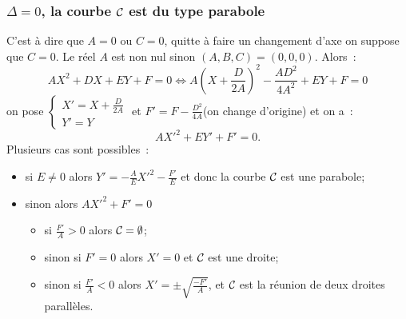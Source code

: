 \subsubsection{\(\Delta=0\), la courbe \(\mathcal{C}_{{}}\) est du type parabole}
C'est à dire que \(A=0\) ou \(C=0\), quitte à faire un changement d'axe on suppose que \(C=0\). Le réel \(A\) est non nul sinon \((A,B,C)=(0,0,0)\). Alors~:
\begin{equation}
  AX^2+DX+EY+F=0 \iff A\left(X+\frac{D}{2A}\right)^2-\frac{AD^2}{4A^2}+EY+F=0
\end{equation}
on pose \(\begin{cases}X'=X+\frac{D}{2A} \\ Y'=Y\end{cases}\) et \(F'=F-\frac{D^2}{4A}\)(on change d'origine) et on a~:
\begin{equation}
  AX'^2+EY'+F'=0.
\end{equation}
Plusieurs cas sont possibles~:
\begin{itemize}
\item si \(E \neq 0\) alors \(Y'=-\frac{A}{E}X'^2-\frac{F'}{E}\) et donc la courbe \(\mathcal{C}_{{}}\) est une parabole;
\item sinon alors \(AX'^2+F'=0\)
  \begin{itemize}
  \item si \(\frac{F'}{A}>0\) alors \(\mathcal{C}_{{}}=\emptyset\);
  \item sinon si \(F'=0\) alors \(X'=0\) et \(\mathcal{C}_{{}}\) est une droite;
  \item sinon si \(\frac{F'}{A}<0\) alors \(X'=\pm \sqrt{\frac{-F'}{A}}\), et \(\mathcal{C}_{{}}\) est la réunion de deux droites parallèles.
  \end{itemize}
\end{itemize}

